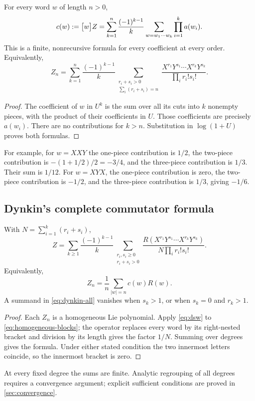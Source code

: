\begin{theorem}\label{thm:word-cut}
For every word $w$ of length $n>0$,
\begin{equation}\label{eq:word-cut}
 c(w):=\bigl[w\bigr]Z
 =\sum_{k=1}^{n}\frac{(-1)^{k-1}}{k}
   \sum_{w=w_1\cdots w_k}\prod_{i=1}^k a(w_i).
\end{equation}
This is a finite, nonrecursive formula for every coefficient at every order. Equivalently,
\begin{equation}\label{eq:homogeneous-blocks}
 Z_n=\sum_{k=1}^{n}\frac{(-1)^{k-1}}{k}
 \sum_{\substack{r_i+s_i>0\\\sum_i(r_i+s_i)=n}}
 \frac{X^{r_1}Y^{s_1}\cdots X^{r_k}Y^{s_k}}
 {\prod_i r_i!s_i!}.
\end{equation}
\end{theorem}
\begin{proof}
The coefficient of $w$ in $U^k$ is the sum over all its cuts into $k$ nonempty pieces, with the product of their coefficients in $U$. Those coefficients are precisely $a(w_i)$. There are no contributions for $k>n$. Substitution in $\log(1+U)$ proves both formulas.
\end{proof}
For example, for $w=XXY$ the one-piece contribution is $1/2$, the two-piece contribution is $-(1+1/2)/2=-3/4$, and the three-piece contribution is $1/3$. Their sum is $1/12$. For $w=XYX$, the one-piece contribution is zero, the two-piece contribution is $-1/2$, and the three-piece contribution is $1/3$, giving $-1/6$.

\subsection{Dynkin's complete commutator formula}
\begin{theorem}\label{thm:dynkin}
With $N=\sum_{i=1}^k(r_i+s_i)$,
\begin{equation}\label{eq:dynkin-all}
 \boxed{\displaystyle
 Z=\sum_{k\geq1}\frac{(-1)^{k-1}}{k}
 \sum_{\substack{r_i,s_i\geq0\\r_i+s_i>0}}
 \frac{R(X^{r_1}Y^{s_1}\cdots X^{r_k}Y^{s_k})}
 {N\prod_i r_i!s_i!}.}
\end{equation}
Equivalently,
\begin{equation}\label{eq:dynkin-word}
 Z_n=\frac1n\sum_{|w|=n}c(w)R(w).
\end{equation}
A summand in \cref{eq:dynkin-all} vanishes when $s_k>1$, or when $s_k=0$ and $r_k>1$.
\end{theorem}
\begin{proof}
Each $Z_n$ is a homogeneous Lie polynomial. Apply \cref{eq:dsw} to \cref{eq:homogeneous-blocks}; the operator replaces every word by its right-nested bracket and division by its length gives the factor $1/N$. Summing over degrees gives the formula. Under either stated condition the two innermost letters coincide, so the innermost bracket is zero.
\end{proof}
At every fixed degree the sums are finite. Analytic regrouping of all degrees requires a convergence argument; explicit sufficient conditions are proved in \cref{sec:convergence}.

